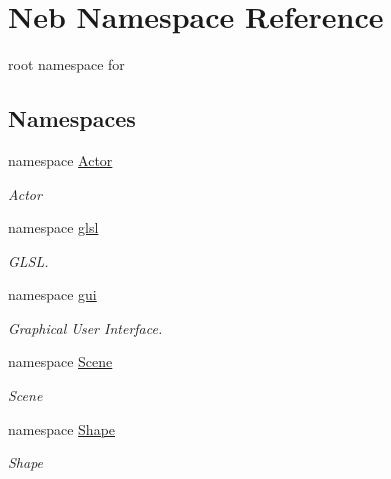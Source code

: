 \hypertarget{namespaceNeb}{\section{\-Neb \-Namespace \-Reference}
\label{namespaceNeb}
}


root namespace for   


\subsection*{\-Namespaces}
\begin{DoxyCompactItemize}
\item 
namespace \hyperlink{namespaceNeb_1_1Actor}{\-Actor}
\begin{DoxyCompactList}\small\item\em \-Actor \end{DoxyCompactList}\item 
namespace \hyperlink{namespaceNeb_1_1glsl}{glsl}
\begin{DoxyCompactList}\small\item\em \-G\-L\-S\-L. \end{DoxyCompactList}\item 
namespace \hyperlink{namespaceNeb_1_1gui}{gui}
\begin{DoxyCompactList}\small\item\em \-Graphical \-User \-Interface. \end{DoxyCompactList}\item 
namespace \hyperlink{namespaceNeb_1_1Scene}{\-Scene}
\begin{DoxyCompactList}\small\item\em \-Scene \end{DoxyCompactList}\item 
namespace \hyperlink{namespaceNeb_1_1Shape}{\-Shape}
\begin{DoxyCompactList}\small\item\em \-Shape \end{DoxyCompactList}\end{DoxyCompactItemize}
